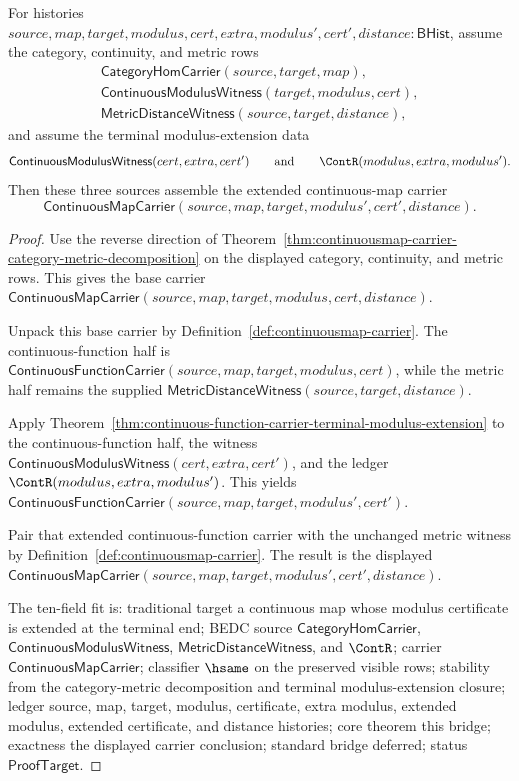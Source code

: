 \begin{theorem}
\label{thm:continuousmap-category-metric-terminal-extension-bridge}
For histories
$source,map,target,modulus,cert,extra,modulus',cert',distance:\mathsf{BHist}$,
assume the category, continuity, and metric rows
$$
\begin{array}{l}
\mathsf{CategoryHomCarrier}(source,target,map),\\
\mathsf{ContinuousModulusWitness}(target,modulus,cert),\\
\mathsf{MetricDistanceWitness}(source,target,distance),
\end{array}
$$
and assume the terminal modulus-extension data
$$
\mathsf{ContinuousModulusWitness}(cert,extra,cert')
\qquad\text{and}\qquad
\ContR(modulus,extra,modulus').
$$
Then these three sources assemble the extended continuous-map carrier
$$
\mathsf{ContinuousMapCarrier}(source,map,target,modulus',cert',distance).
$$
\end{theorem}
\begin{proof}
Use the reverse direction of
Theorem~\ref{thm:continuousmap-carrier-category-metric-decomposition} on the
displayed category, continuity, and metric rows. This gives the base carrier
$\mathsf{ContinuousMapCarrier}(source,map,target,modulus,cert,distance)$.

Unpack this base carrier by Definition~\ref{def:continuousmap-carrier}. The
continuous-function half is
$\mathsf{ContinuousFunctionCarrier}(source,map,target,modulus,cert)$, while the
metric half remains the supplied
$\mathsf{MetricDistanceWitness}(source,target,distance)$.

Apply
Theorem~\ref{thm:continuous-function-carrier-terminal-modulus-extension} to
the continuous-function half, the witness
$\mathsf{ContinuousModulusWitness}(cert,extra,cert')$, and the ledger
$\ContR(modulus,extra,modulus')$. This yields
$\mathsf{ContinuousFunctionCarrier}(source,map,target,modulus',cert')$.

Pair that extended continuous-function carrier with the unchanged metric
witness by Definition~\ref{def:continuousmap-carrier}. The result is the
displayed
$\mathsf{ContinuousMapCarrier}(source,map,target,modulus',cert',distance)$.

The ten-field fit is: traditional target a continuous map whose modulus
certificate is extended at the terminal end; BEDC source
$\mathsf{CategoryHomCarrier}$, $\mathsf{ContinuousModulusWitness}$,
$\mathsf{MetricDistanceWitness}$, and $\ContR$; carrier
$\mathsf{ContinuousMapCarrier}$; classifier $\hsame$ on the preserved visible
rows; stability from the category-metric decomposition and terminal
modulus-extension closure; ledger source, map, target, modulus, certificate,
extra modulus, extended modulus, extended certificate, and distance histories;
core theorem this bridge; exactness the displayed carrier conclusion; standard
bridge deferred; status $\mathsf{ProofTarget}$.
\end{proof}

